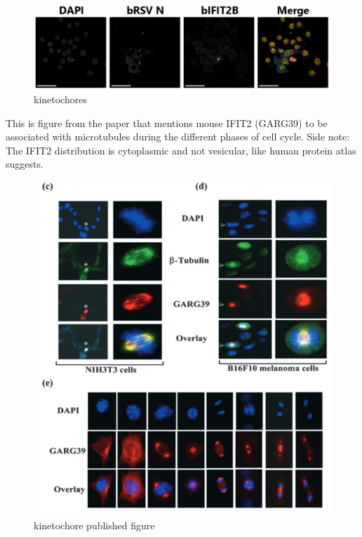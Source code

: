 \begin{figure}
    \centering
    \includegraphics[width=1\linewidth]{09. Chapter 4//Figs//04. IFIT2AB Discussion/05. kinetochores.png}
    \caption[kinetochores]{kinetochores}
    \label{kinetochores}
\end{figure}

This is figure from the paper that mentions mouse IFIT2 (GARG39) to be associated with microtubules during the different phases of cell cycle.
Side note: The IFIT2 distribution is cytoplasmic and not vesicular, like human protein atlas suggests.

\begin{figure}
    \centering
    \includegraphics[width=1\linewidth]{09. Chapter 4//Figs//04. IFIT2AB Discussion/06. kinetochore published figure.png}
    \caption[kinetochore published figure]{kinetochore published figure}
    \label{kinetochore published figure}
\end{figure}

